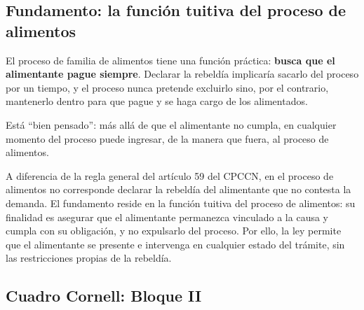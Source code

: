 \documentclass[12pt,oneside]{book}
\begin{document}
\subsection{Fundamento: la funci\'on tuitiva del proceso de alimentos}

El proceso de familia de alimentos tiene una funci\'on pr\'actica: \textbf{busca que el alimentante pague siempre}. Declarar la rebeld\'ia implicar\'ia sacarlo del proceso por un tiempo, y el proceso nunca pretende excluirlo sino, por el contrario, mantenerlo dentro para que pague y se haga cargo de los alimentados.

Est\'a ``bien pensado'': m\'as all\'a de que el alimentante no cumpla, en cualquier momento del proceso puede ingresar, de la manera que fuera, al proceso de alimentos.

\begin{important}
A diferencia de la regla general del art\'iculo 59 del CPCCN, en el proceso de alimentos no corresponde declarar la rebeld\'ia del alimentante que no contesta la demanda. El fundamento reside en la funci\'on tuitiva del proceso de alimentos: su finalidad es asegurar que el alimentante permanezca vinculado a la causa y cumpla con su obligaci\'on, y no expulsarlo del proceso. Por ello, la ley permite que el alimentante se presente e intervenga en cualquier estado del tr\'amite, sin las restricciones propias de la rebeld\'ia.
\end{important}

\subsection*{Cuadro Cornell: Bloque II}
\end{document}
